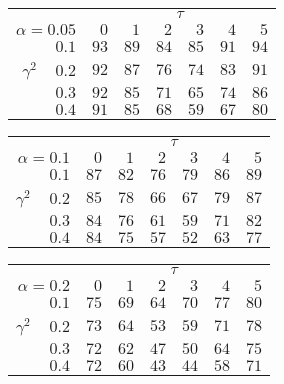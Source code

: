 \begin{tabular}{r|rrrrrr}
\hline\hline
 &\multicolumn{6}{c}{$\tau$} \\ 
 $\alpha = 0.05$ & $0$ & $1$ & $2$ & $3$ & $4$ & $5$ \\ 
 \hline$0.1$ & $93$ & $89$ & $84$ & $85$ & $91$ & $94$\\ 
$\gamma^2\;\;\;$ $0.2$ & $92$ & $87$ & $76$ & $74$ & $83$ & $91$\\ 
$0.3$ & $92$ & $85$ & $71$ & $65$ & $74$ & $86$\\ 
$0.4$ & $91$ & $85$ & $68$ & $59$ & $67$ & $80$\\ 
 \hline 
 \end{tabular}
 
 \vspace{2em} 
 
\begin{tabular}{r|rrrrrr}
\hline\hline
 &\multicolumn{6}{c}{$\tau$} \\ 
 $\alpha = 0.1$ & $0$ & $1$ & $2$ & $3$ & $4$ & $5$ \\ 
 \hline$0.1$ & $87$ & $82$ & $76$ & $79$ & $86$ & $89$\\ 
$\gamma^2\;\;\;$ $0.2$ & $85$ & $78$ & $66$ & $67$ & $79$ & $87$\\ 
$0.3$ & $84$ & $76$ & $61$ & $59$ & $71$ & $82$\\ 
$0.4$ & $84$ & $75$ & $57$ & $52$ & $63$ & $77$\\ 
 \hline 
 \end{tabular}
 
 \vspace{2em} 
 
\begin{tabular}{r|rrrrrr}
\hline\hline
 &\multicolumn{6}{c}{$\tau$} \\ 
 $\alpha = 0.2$ & $0$ & $1$ & $2$ & $3$ & $4$ & $5$ \\ 
 \hline$0.1$ & $75$ & $69$ & $64$ & $70$ & $77$ & $80$\\ 
$\gamma^2\;\;\;$ $0.2$ & $73$ & $64$ & $53$ & $59$ & $71$ & $78$\\ 
$0.3$ & $72$ & $62$ & $47$ & $50$ & $64$ & $75$\\ 
$0.4$ & $72$ & $60$ & $43$ & $44$ & $58$ & $71$\\ 
 \hline 
 \end{tabular}